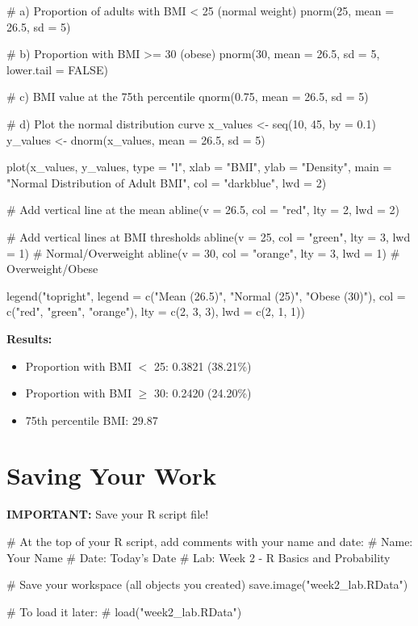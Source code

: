\documentclass[11pt]{article}
\begin{document}
\begin{answerbox}
\begin{rcode}
# a) Proportion of adults with BMI < 25 (normal weight)
pnorm(25, mean = 26.5, sd = 5)

# b) Proportion with BMI >= 30 (obese)
pnorm(30, mean = 26.5, sd = 5, lower.tail = FALSE)

# c) BMI value at the 75th percentile
qnorm(0.75, mean = 26.5, sd = 5)

# d) Plot the normal distribution curve
x_values <- seq(10, 45, by = 0.1)
y_values <- dnorm(x_values, mean = 26.5, sd = 5)

plot(x_values, y_values,
     type = "l",
     xlab = "BMI",
     ylab = "Density",
     main = "Normal Distribution of Adult BMI",
     col = "darkblue",
     lwd = 2)

# Add vertical line at the mean
abline(v = 26.5, col = "red", lty = 2, lwd = 2)

# Add vertical lines at BMI thresholds
abline(v = 25, col = "green", lty = 3, lwd = 1)  # Normal/Overweight
abline(v = 30, col = "orange", lty = 3, lwd = 1) # Overweight/Obese

legend("topright",
       legend = c("Mean (26.5)", "Normal (25)", "Obese (30)"),
       col = c("red", "green", "orange"),
       lty = c(2, 3, 3),
       lwd = c(2, 1, 1))
\end{rcode}

\textbf{Results:}
\begin{itemize}
\item Proportion with BMI $<$ 25: 0.3821 (38.21\%)
\item Proportion with BMI $\geq$ 30: 0.2420 (24.20\%)
\item 75th percentile BMI: 29.87
\end{itemize}
\end{answerbox}

\section{Saving Your Work}

\textbf{IMPORTANT:} Save your R script file!

\begin{rcode}
# At the top of your R script, add comments with your name and date:
# Name: Your Name
# Date: Today's Date
# Lab: Week 2 - R Basics and Probability

# Save your workspace (all objects you created)
save.image("week2_lab.RData")

# To load it later:
# load("week2_lab.RData")
\end{rcode}
\end{document}
